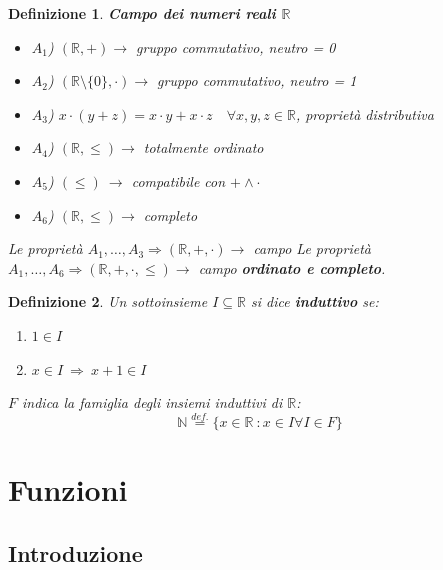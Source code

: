 \documentclass[12pt, a4paper]{article}
\theoremstyle{break}
\newtheorem{defn}{Definizione}
\theoremstyle{lemma}
\theoremstyle{lemma}
\theoremstyle{lemma}
\begin{document}
\begin{defn} \textbf{Campo dei numeri reali $\mathbb{R} $}
	
	\begin{itemize}
		\item $A_1$) $(\mathbb{R}, +) \rightarrow$ gruppo commutativo, neutro = 0
		\item $A_2$) $(\mathbb{R} \setminus \{ 0 \} , \cdot) \rightarrow$  gruppo commutativo, neutro = 1
		\item $A_3$) $ x \cdot (y+z) = x \cdot y+x \cdot z \quad \forall x,y,z \in \mathbb{R}$, proprietà distributiva
		\item $A_4$) $(\mathbb{R}, \leq ) \rightarrow $ totalmente ordinato
		\item $A_5$) $ (\leq )\ \rightarrow $ compatibile con $ + \land \cdot $
		\item $A_6$) $(\mathbb{R}, \leq ) \rightarrow $ completo 

	\end{itemize}
	Le proprietà $ A_1, \dots , A_3 \Longrightarrow (\mathbb{R}, +, \cdot) \rightarrow $ campo \newline
	Le proprietà $ A_1, \dots , A_6 \Longrightarrow (\mathbb{R}, +, \cdot, \leq) \rightarrow $ campo \textbf{ordinato e completo}.

\end{defn}

\begin{defn} 
	Un sottoinsieme $ I \subseteq \mathbb{R} $ si dice \textbf{induttivo} se:
	\begin{enumerate}
   	\item $ 1 \in I $
	\item $ x \in I\ \Rightarrow\ x + 1 \in I $
        \end{enumerate}
	$ \textit{F} $ indica la famiglia degli insiemi induttivi di $\mathbb{R} $:
	\begin{equation}
		\mathbb{N} \overset{def.}{=} \{ x \in \mathbb{R}\ : x \in I \forall I \in \textit{F} \} 
	\end{equation}
\end{defn}



\section{Funzioni}

\subsection{Introduzione}
\end{document}
